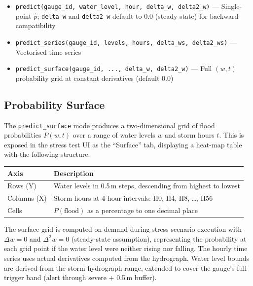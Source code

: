 \documentclass[11pt,a4paper]{article}
\begin{document}
\begin{itemize}[nosep]
    \item \texttt{predict(gauge\_id, water\_level, hour, delta\_w, delta2\_w)}
          --- Single-point $\hat{p}$; \texttt{delta\_w} and \texttt{delta2\_w}
          default to 0.0 (steady state) for backward compatibility
    \item \texttt{predict\_series(gauge\_id, levels, hours, delta\_ws, delta2\_ws)}
          --- Vectorised time series
    \item \texttt{predict\_surface(gauge\_id, ..., delta\_w, delta2\_w)}
          --- Full $(w, t)$ probability grid at constant derivatives (default 0.0)
\end{itemize}

\subsection{Probability Surface}
The \texttt{predict\_surface} mode produces a two-dimensional grid of flood
probabilities $P(w, t)$ over a range of water levels $w$ and storm hours $t$.
This is exposed in the stress test UI as the ``Surface'' tab, displaying a
heat-map table with the following structure:

\begin{center}
\begin{tabular}{ll}
\toprule
\textbf{Axis} & \textbf{Description} \\
\midrule
Rows (Y) & Water levels in 0.5\,m steps, descending from highest to lowest \\
Columns (X) & Storm hours at 4-hour intervals: H0, H4, H8, \ldots, H56 \\
Cells & $P(\text{flood})$ as a percentage to one decimal place \\
\bottomrule
\end{tabular}
\end{center}

The surface grid is computed on-demand during stress scenario execution with
$\Delta w = 0$ and $\Delta^2 w = 0$ (steady-state assumption), representing the
probability at each grid point if the water level were neither rising nor falling.
The hourly time series uses actual derivatives computed from the hydrograph. Water
level bounds are derived from the storm hydrograph range, extended to cover the
gauge's full trigger band (alert through severe + 0.5\,m buffer).
\end{document}
